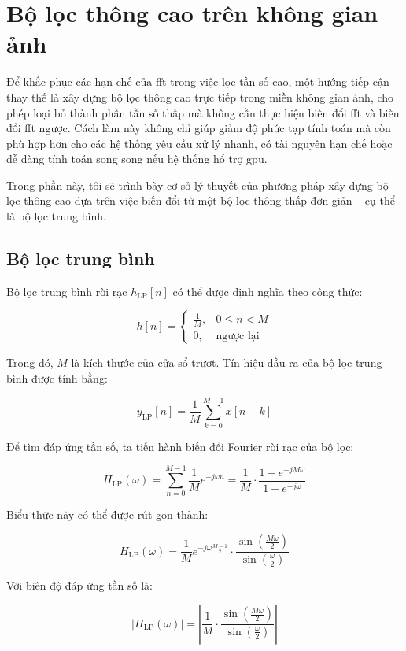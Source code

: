 \section{Bộ lọc thông cao trên không gian ảnh}

Để khắc phục các hạn chế của \gls{fft} trong việc lọc tần số cao, một hướng tiếp cận thay thế là xây dựng bộ lọc thông cao trực tiếp trong miền không gian ảnh, cho phép loại bỏ thành phần tần số thấp mà không cần thực hiện biến đổi \gls{fft} và biến đổi \gls{fft} ngược.
%
Cách làm này không chỉ giúp giảm độ phức tạp tính toán mà còn phù hợp hơn cho các hệ thống yêu cầu xử lý nhanh, có tài nguyên hạn chế hoặc dễ dàng tính toán song song nếu hệ thống hổ trợ \gls{gpu}.

Trong phần này, tôi sẽ trình bày cơ sở lý thuyết của phương pháp xây dựng bộ lọc thông cao dựa trên việc biến đổi từ một bộ lọc thông thấp đơn giản – cụ thể là bộ lọc trung bình. 
%

\subsection{Bộ lọc trung bình}

Bộ lọc trung bình rời rạc \( h_{\mathrm{LP}}[n] \) có thể được định nghĩa theo công thức:

\[
h[n] =
\begin{cases}
	\frac{1}{M}, & 0 \leq n < M \\
	0, & \text{ngược lại}
\end{cases}
\]

Trong đó, \( M \) là kích thước của cửa sổ trượt. Tín hiệu đầu ra của bộ lọc trung bình được tính bằng:

\[
y_{\mathrm{LP}}[n] = \frac{1}{M} \sum_{k=0}^{M-1} x[n-k]
\]

Để tìm đáp ứng tần số, ta tiến hành biến đổi Fourier rời rạc của bộ lọc:

\[
H_{\mathrm{LP}}(\omega) = \sum_{n=0}^{M-1} \frac{1}{M} e^{-j \omega n} = \frac{1}{M} \cdot \frac{1 - e^{-j M \omega}}{1 - e^{-j \omega}}
\]

Biểu thức này có thể được rút gọn thành:

\[
H_{\mathrm{LP}}(\omega) = \frac{1}{M} e^{-j \omega \frac{M-1}{2}} \cdot \frac{\sin\left(\frac{M \omega}{2}\right)}{\sin\left(\frac{\omega}{2}\right)}
\]

Với biên độ đáp ứng tần số là:

\[
|H_{\mathrm{LP}}(\omega)| = \left| \frac{1}{M} \cdot \frac{\sin\left( \frac{M \omega}{2} \right)}{\sin\left( \frac{\omega}{2} \right)} \right|
\]

